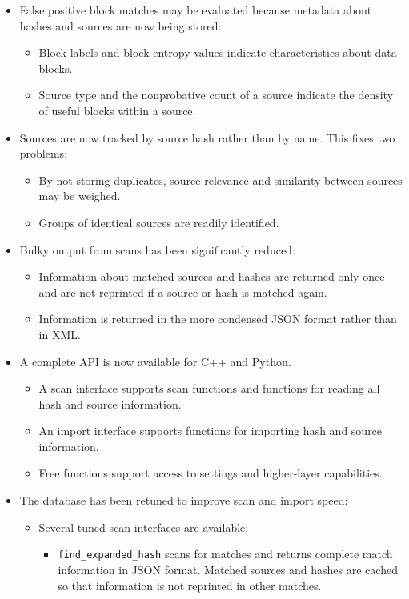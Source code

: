 \documentclass[11pt,fleqn]{article} %
\begin{document}
\begin{itemize}
\item False positive block matches may be evaluated because metadata about hashes and sources are now being stored:
  \begin{itemize}
  \item Block labels and block entropy values indicate characteristics about data blocks.
  \item Source type and the nonprobative count of a source indicate the density of useful blocks within a source.
\end{itemize}
\item Sources are now tracked by source hash rather than by name.  This fixes two problems:
  \begin{itemize}
  \item By not storing duplicates, source relevance and similarity between sources may be weighed.
  \item Groups of identical sources are readily identified.
  \end{itemize}
\item Bulky output from scans has been significantly reduced:
  \begin{itemize}
  \item Information about matched sources and hashes are returned only once and are not reprinted if a source or hash is matched again.
  \item Information is returned in the more condensed JSON format rather than in XML.
  \end{itemize}
\item A complete \hdb API is now available for C++ and Python.
  \begin{itemize}
  \item A scan interface supports scan functions and functions for reading all hash and source information.
  \item An import interface supports functions for importing hash and source information.
  \item Free functions support access to settings and higher-layer capabilities.
  \end{itemize}
\item The database has been retuned to improve scan and import speed:
  \begin{itemize}
  \item Several tuned scan interfaces are available:
    \begin{itemize}
    \item \verb+find_expanded_hash+ scans for matches and returns complete match information in JSON format.  Matched sources and hashes are cached so that information is not reprinted in other matches.

\end{itemize}
\end{itemize}
\end{itemize}
\end{document}
